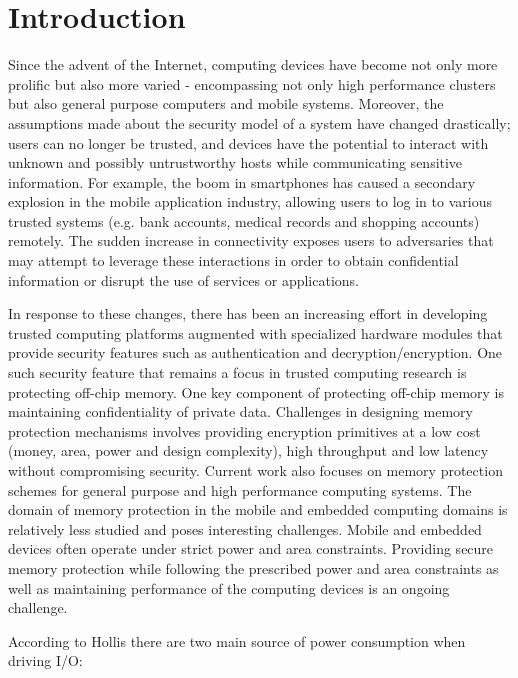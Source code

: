 \section{Introduction}
\label{sec-introduction}

Since the advent of the Internet, computing devices have become not only more
prolific but also more varied - encompassing not only high performance
clusters but also general purpose computers and mobile systems.  Moreover, the
assumptions made about the security model of a system have changed drastically;
users can no longer be trusted, and devices have the potential to interact with
unknown and possibly untrustworthy hosts while communicating sensitive
information. For example, the boom in smartphones has caused a secondary
explosion in the mobile application industry, allowing users to log in to
various trusted systems (e.g. bank accounts, medical records and shopping
accounts) remotely.  The sudden increase in connectivity exposes users to
adversaries that may attempt to leverage these interactions in order to obtain
confidential information or disrupt the use of services or applications.

In response to these changes, there has been an increasing effort in developing
trusted computing platforms augmented with specialized hardware modules that
provide security features such as authentication and decryption/encryption. One
such security feature that remains a focus in trusted computing research is
protecting off-chip memory. One key component of protecting off-chip memory is
maintaining confidentiality of private data. Challenges in designing memory
protection mechanisms involves providing encryption primitives at a low cost
(money, area, power and design complexity), high throughput and low latency
without compromising security. Current work also focuses on memory protection
schemes for general purpose and high performance computing systems. The domain
of memory protection in the mobile and embedded computing domains is relatively
less studied and poses interesting challenges. Mobile and embedded devices
often operate under strict power and area constraints. Providing secure memory
protection while following the prescribed power and area constraints as well as
maintaining performance of the computing devices is an ongoing challenge.

According to Hollis \cite{hollis} there are two main source of power
consumption when driving I/O:

